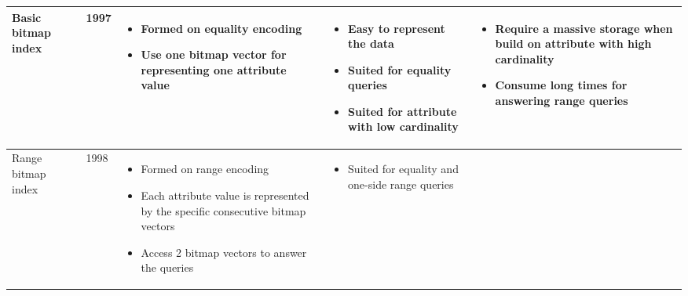\documentclass[../main/thesis.tex]{subfiles}
\begin{document}
\begin{landscape}
\begin{longtable}{K{0.12\textwidth}K{0.06\textwidth}K{0.42\textwidth}K{0.42\textwidth}K{0.42\textwidth}}
		Basic bitmap index \cite{BasicBI} & 1997 & 
		\begin{minipage}[t]{0.42\textwidth}
			\begin{itemize}[label=-, leftmargin=0.5cm, noitemsep]
				\item Formed on equality encoding
				\item Use one bitmap vector for representing one attribute value
			\end{itemize}
		\end{minipage} &
		\begin{minipage}[t]{0.42\textwidth}
			\begin{itemize}[label=-, leftmargin=0.5cm, noitemsep]
				\item Easy to represent the data
				\item Suited for equality queries
				\item Suited for attribute with low cardinality
			\end{itemize}
		\end{minipage} &
		\begin{minipage}[t]{0.42\textwidth}
			\begin{itemize}[label=-, leftmargin=0.5cm, noitemsep]
				\item Require a massive storage when build on attribute with high cardinality
				\item Consume long times for answering range queries
			\end{itemize}
		\end{minipage} \\
		\hline
		Range bitmap index \cite{RangeBI} & 1998 & 
		\begin{minipage}[t]{0.42\textwidth}
			\begin{itemize}[label=-, leftmargin=0.5cm, noitemsep]
				\item Formed on range encoding
				\item Each attribute value is represented by the specific consecutive bitmap vectors
				\item Access 2 bitmap vectors to answer the queries
			\end{itemize}
		\end{minipage} &
		\begin{minipage}[t]{0.42\textwidth}
			\begin{itemize}[label=-, leftmargin=0.5cm, noitemsep]
				\item Suited for equality and one-side range queries

\end{itemize}
\end{minipage}
\end{longtable}
\end{landscape}
\end{document}
